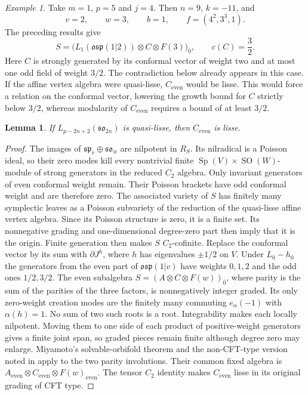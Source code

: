 \documentclass[11pt,a4paper]{amsart}
\numberwithin{equation}{section}
\newtheorem{lemma}[theorem]{Lemma}
\theoremstyle{definition}
\theoremstyle{remark}
\newtheorem{example}[theorem]{Example}
\newcommand{\spg}{\mathfrak{sp}}
\newcommand{\sog}{\mathfrak{so}}
\begin{document}
\begin{example}\label{ex:D9-growth}
Take $m=1$, $p=5$ and $j=4$. Then $n=9$, $k=-11$, and
$$
 v=2,\qquad w=3,\qquad b=1,\qquad f=(4^2,3^3,1).
$$
The preceding results give
$$
 S=\bigl(L_1(\mathfrak{osp}(1|2))\otimes C\otimes F(3)\bigr)_{\overline0},
 \qquad c(C)=\frac32.
$$
Here $C$ is strongly generated by its conformal vector of weight two
and at most one odd field of weight $3/2$. The contradiction below
already appears in this case. If the affine vertex algebra were
quasi-lisse, $C_{\mathrm{even}}$ would be lisse. This would force a
relation on the conformal vector, lowering the growth bound for $C$
strictly below $3/2$, whereas modularity of $C_{\mathrm{even}}$
requires a bound of at least $3/2$.
\end{example}

\begin{lemma}\label{seed:D-commutant-lisse}
If $L_{p-2n+2}(\sog_{2n})$ is quasi-lisse, then $C_{\mathrm{even}}$
is lisse.
\end{lemma}
\begin{proof}
The images of $\spg_v\oplus\sog_w$ are nilpotent in $R_S$. Its nilradical
is a Poisson ideal, so their zero modes kill every nontrivial finite
$\operatorname{Sp}(V)\times\operatorname{SO}(W)$-module of strong
generators in the reduced $C_2$ algebra. Only invariant generators
of even conformal weight remain. Their Poisson brackets have odd conformal weight and are therefore
zero. The associated variety of $S$ has finitely many symplectic
leaves as a Poisson subvariety of the reduction of the quasi-lisse
affine vertex algebra. Since its Poisson structure is zero, it is
a finite set. Its nonnegative grading and one-dimensional degree-zero
part then imply that it is the origin.
Finite generation then makes $S$ $C_2$-cofinite.
Replace the conformal vector by its sum with $\partial J^h$, where $h$ has eigenvalues
$\pm1/2$ on $V$. Under $L_0-h_0$ the generators from the even part of $\mathfrak{osp}(1|v)$ have
weights $0,1,2$ and the odd ones $1/2,3/2$. The even subalgebra
$S=(A\otimes C\otimes F(w))_{\overline0}$, where parity is the sum
of the parities of the three factors, is nonnegatively integer graded. Its only zero-weight creation
modes are the finitely many commuting $e_\alpha(-1)$ with
$\alpha(h)=1$. No sum of two such roots is a root. Integrability
makes each locally nilpotent. Moving them to one side of each
product of positive-weight generators gives a finite joint span, so graded pieces
remain finite although degree zero may enlarge.
Miyamoto's solvable-orbifold theorem and the non-CFT-type version
noted in \cite[Theorem~1 and Remark~1]{Miyamoto2015}
apply to the two parity involutions. Their common fixed algebra is
$A_{\mathrm{even}}\otimes C_{\mathrm{even}}\otimes F(w)_{\mathrm{even}}$.
The tensor $C_2$ identity makes $C_{\mathrm{even}}$ lisse in its
original grading of CFT type.

\end{proof}
\end{document}

